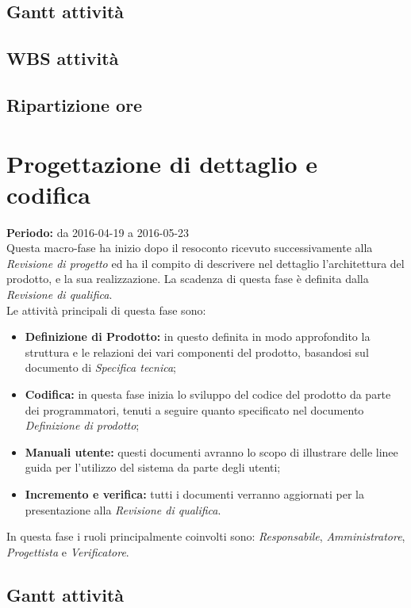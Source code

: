 \documentclass[a4paper]{report}
\begin{document}
			\subsection{Gantt attività}
			\subsection{WBS attività}
			\subsection{Ripartizione ore}
		\section{Progettazione di dettaglio e codifica}
			\textbf{Periodo:} da 2016-04-19 a 2016-05-23 \\
			Questa macro-fase ha inizio dopo il resoconto ricevuto successivamente alla \emph{Revisione di progetto} ed ha 
			il compito di descrivere nel dettaglio l'architettura del prodotto, e la sua realizzazione. La scadenza di questa 
			fase è definita dalla \emph{Revisione di qualifica}. \\Le attività principali di questa fase sono:
			\begin{itemize}
				\item \textbf{Definizione di Prodotto:} in questo definita in modo approfondito la struttura e le relazioni 
				dei vari componenti del prodotto, basandosi sul documento di \emph{Specifica tecnica}; 
				\item \textbf{Codifica:} in questa fase inizia lo sviluppo del codice del prodotto da parte dei programmatori, 
				tenuti a seguire quanto specificato nel documento \emph{Definizione di prodotto};
				\item \textbf{Manuali utente:} questi documenti avranno lo scopo di illustrare delle linee guida per l'utilizzo 
				del sistema da parte degli utenti;
				\item \textbf{Incremento e verifica:} tutti i documenti verranno aggiornati per la presentazione alla 
				\emph{Revisione di qualifica}.
			\end{itemize}
			In questa fase i ruoli principalmente coinvolti sono: \emph{Responsabile}, \emph{Amministratore},
			\emph{Progettista} e \emph{Verificatore}.

			\subsection{Gantt attività}
\end{document}
